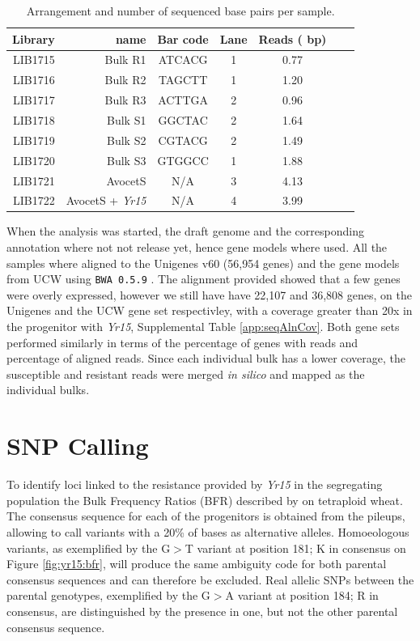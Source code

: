 \begin{table}
\centering
\caption{Arrangement and number of sequenced base pairs per sample. }
\label{tab:yr15:reads}
\begin{tabular}{rrccccc}
\toprule
Library & name & Bar code & Lane   &  Reads (\e{8} bp)\\ 
\midrule
LIB1715 & Bulk R1& ATCACG & 1 	& 0.77\\
LIB1716 & Bulk R2& TAGCTT & 1 		& 1.20\\
LIB1717 & Bulk R3& ACTTGA & 2 	& 0.96  \\ 
LIB1718 & Bulk S1& GGCTAC & 2 	& 1.64   \\ 
LIB1719 & Bulk S2 & CGTACG & 2 	& 1.49  \\ 
LIB1720 & Bulk S3 & GTGGCC & 1 	&1.88  \\ 
LIB1721 & AvocetS & N/A & 3 		& 4.13 \\ 
LIB1722 & AvocetS + \textit{Yr15} & N/A & 4 	& 3.99  \\ 
\bottomrule
\end{tabular}
\end{table}

When the analysis was started, the draft genome and the corresponding annotation where not not release yet, hence gene models where used. 
All the samples where aligned to the Unigenes v60 (56,954 genes) and the gene models from UCW \citep{Krasileva2013} using \verb|BWA 0.5.9| \citep{Li2009}. 
The alignment provided showed that a few genes were overly expressed, however we still have have 22,107 and 36,808 genes, on the Unigenes and the UCW gene set respectivley,  with a coverage greater than 20x in the progenitor with \textit{Yr15}, Supplemental Table \ref{app:seqAlnCov}. 
Both gene sets performed similarly in terms of the percentage of genes with reads and percentage of aligned reads. 
Since each individual bulk has a lower coverage, the susceptible and resistant reads were merged \textit{in silico} and mapped as the individual bulks.  

\section{SNP Calling}

To identify loci linked to the resistance provided by \textit{Yr15} in the segregating population the Bulk Frequency Ratios (BFR) described by \cite{Trick2012} on tetraploid wheat.
The consensus sequence for each of the progenitors is obtained from the pileups, allowing to call variants with a 20\% of bases as alternative alleles. 
Homoeologous variants, as exemplified by the G$>$T variant at position 181; K in consensus on Figure \ref{fig:yr15:bfr}, will produce the same ambiguity code for both parental consensus sequences and can therefore be excluded. 
Real allelic SNPs between the parental genotypes, exemplified by the G$>$A variant at position 184; R in consensus, are distinguished by the presence in one, but not the other parental consensus sequence. 

